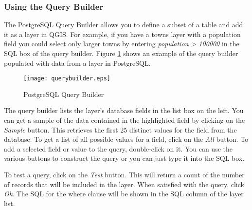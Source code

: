 \subsubsection{Using the Query Builder}\label{sec:query_builder}

The PostgreSQL Query Builder allows you to define a subset of a table and add
it as a layer in QGIS.  For example, if you have a towns layer with a
population field you could select only larger towns by entering
\textsl{population > 100000} in the SQL box of the query builder. Figure
\ref{fig:query_builder} shows an example of the query builder populated with
data from a layer in PostgreSQL. 

\begin{figure}[ht]
  \begin{center}
    \caption{PostgreSQL Query Builder}\label{fig:query_builder}\smallskip
    \texttt{[image: querybuilder.eps]}
  \end{center}  
\end{figure}

The query builder lists the layer's database
fields in the list box on the left.  You can get a sample of the data
contained
in the highlighted field by clicking on the \textit{Sample} button. This retrieves the first 25 distinct values
for the field from the database. To get a list of all possible values for a
field, click on the \textit{All} button. To add a selected field or value to the query, double-click on
it. You can use the various buttons to
construct the query or you can just type it into the SQL box.

To test a query, click on the \textit{Test} button. This will return a count of the number of records that will be
included in the layer. When satisfied with the query, click \textit{Ok}. The
SQL for the where clause will be shown in the SQL column of the layer list.

\begin{Tip}\caption{\textsc{Changing the Layer Definition}}
\end{Tip}

